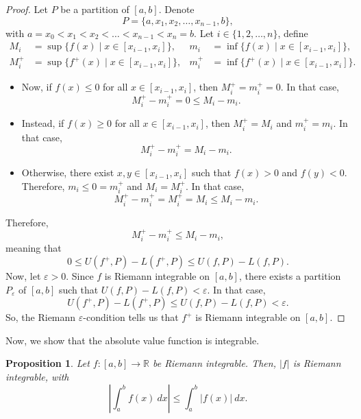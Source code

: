 \documentclass[a4paper, openany]{memoir}
\theoremstyle{definition}
\theoremstyle{plain}
\newtheorem{proposition}[definition]{Proposition}
\begin{document}
\begin{proof}
Let $P$ be a partition of $[a, b]$. Denote
\[P = \{a, x_1, x_2, \dots, x_{n-1}, b\},\]
with $a = x_0 < x_1 < x_2 < \dots < x_{n-1} < x_n = b$. Let $i \in \{1, 2, \dots, n\}$, define
\begin{align*}
    M_i &= \sup \{f(x) \mid x \in [x_{i-1}, x_i]\}, & m_i &= \inf \{f(x) \mid x \in [x_{i-1}, x_i]\}, \\
    M_i^+ &= \sup \{f^+(x) \mid x \in [x_{i-1}, x_i]\}, & m_i^+ &= \inf \{f^+(x) \mid x \in [x_{i-1}, x_i]\} .
\end{align*}
\begin{itemize}
    \item Now, if $f(x) \leqslant 0$ for all $x \in [x_{i-1}, x_i]$, then $M_i^+ = m_i^+ = 0$. In that case,
    \[M_i^+ - m_i^+ = 0 \leqslant M_i - m_i.\]
    
    \item Instead, if $f(x) \geqslant 0$ for all $x \in [x_{i-1}, x_i]$, then $M_i^+ = M_i$ and $m_i^+ = m_i$. In that case,
    \[M_i^+ - m_i^+ = M_i - m_i.\]
    
    \item Otherwise, there exist $x, y \in [x_{i-1}, x_i]$ such that $f(x) > 0$ and $f(y) < 0$. Therefore, $m_i \leqslant 0 = m_i^+$ and $M_i = M_i^+$. In that case,
    \[M_i^+ - m_i^+ = M_i^+ = M_i \leqslant M_i - m_i.\]
\end{itemize}
Therefore, 
\[M_i^+ - m_i^+ \leqslant M_i - m_i,\]
meaning that
\[0 \leqslant U(f^+, P) - L(f^+, P) \leqslant U(f, P) - L(f, P).\]
Now, let $\varepsilon > 0$. Since $f$ is Riemann integrable on $[a, b]$, there exists a partition $P_\varepsilon$ of $[a, b]$ such that $U(f, P) - L(f, P) < \varepsilon$. In that case,
\[U(f^+, P) - L(f^+, P) \leqslant U(f, P) - L(f, P) < \varepsilon.\]
So, the Riemann $\varepsilon$-condition tells us that $f^+$ is Riemann integrable on $[a, b]$.
\end{proof}
\noindent Now, we show that the absolute value function is integrable.
\begin{proposition}
Let $f: [a, b] \to \mathbb{R}$ be Riemann integrable. Then, $|f|$ is Riemann integrable, with
\[\left|\int_a^b f(x) \ dx\right| \leqslant \int_a^b |f(x)| \ dx.\]
\end{proposition}
\end{document}
